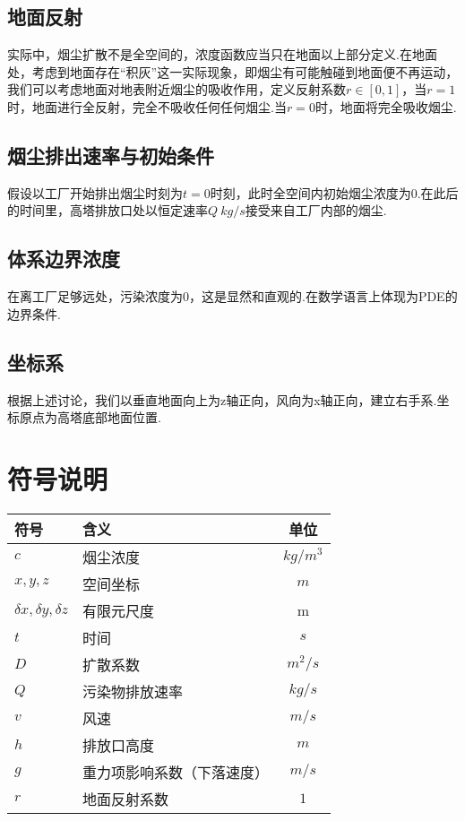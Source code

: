 \documentclass{article}
\begin{document}
	\subsection{地面反射}
	实际中，烟尘扩散不是全空间的，浓度函数应当只在地面以上部分定义.在地面处，考虑到地面存在“积灰”这一实际现象，即烟尘有可能触碰到地面便不再运动，我们可以考虑地面对地表附近烟尘的吸收作用，定义反射系数$r\in[0, 1]$，当$r=1$时，地面进行全反射，完全不吸收任何任何烟尘.当$r=0$时，地面将完全吸收烟尘.
	
	\subsection{烟尘排出速率与初始条件}
	假设以工厂开始排出烟尘时刻为$t=0$时刻，此时全空间内初始烟尘浓度为0.在此后的时间里，高塔排放口处以恒定速率$Q~kg/s$接受来自工厂内部的烟尘.
	
	\subsection{体系边界浓度}
	在离工厂足够远处，污染浓度为0，这是显然和直观的.在数学语言上体现为PDE的边界条件.
	
	\subsection{坐标系}
	根据上述讨论，我们以垂直地面向上为z轴正向，风向为x轴正向，建立右手系.坐标原点为高塔底部地面位置.
	
	\section{符号说明}
	\begin{table}[htbp]
		\centering
		\begin{tabularx}{0.8\textwidth}{XXc}
			\hline
			符号 & 含义 & 单位 \\
			\hline
			$c$ & 烟尘浓度 & $kg/m^3$ \\
			$x, y, z$ & 空间坐标 & $m$ \\
			$\delta x, \delta y, \delta z$ & 有限元尺度 & m \\
			$t$ & 时间 & $s$ \\
			$D$ & 扩散系数 & $m^2/s$ \\
			$Q$ & 污染物排放速率 & $kg/s$ \\
			$v$ & 风速 & $m/s$ \\
			$h$ & 排放口高度 & $m$ \\
			$g$ & 重力项影响系数（下落速度） & $m/s$ \\
			$r$ & 地面反射系数 & $1$ \\
			\hline
		\end{tabularx}	
	\end{table}
	
\end{document}
